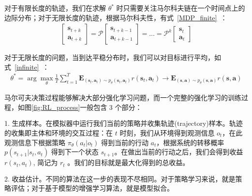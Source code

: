 对于有限长度的轨迹，我们在求解 $\theta^*$ 时只需要关注马尔科夫链在一个时间点上的边际分布；对于无限长度的轨迹，根据马尔科夫性，有式~\eqref{MDP_finite}~：
\begin{equation}
\label{MDP_finite}
\begin{aligned}
\left[\begin{array}{l}\mathbf{s}_{t+k}\\\mathbf{a}_{t+k}\end{array}\right]=\mathcal{P}\left[\begin{array}{l}\mathbf{s}_{t+k-1}\\\mathbf{a}_{t+k-1}\end{array}\right]=...=\mathcal{P}^k\left[\begin{array}{l}\mathbf{s}_{t}\\\mathbf{a}_{t}\end{array}\right]
\end{aligned}
\end{equation}

对于无限长度的问题，当到达平稳分布时，我们可以对目标进行平均，如式~\eqref{infinite}~：
\begin{equation}
\label{infinite}
\begin{aligned}
\theta^*=\arg\max_\theta\frac{1}{T}\sum_{t=1}^T\mathbf{E}_{(\mathbf{s}_t,\mathbf{a}_t)\sim p_\theta(\mathbf{s}_t,\mathbf{a}_t)}r(\mathbf{s}_t,\mathbf{a}_t)\rightarrow \mathbf{E}_{(\mathbf{s},\mathbf{a})\sim p_\theta(\mathbf{s},\mathbf{a})}r(\mathbf{s},\mathbf{a})
\end{aligned}
\end{equation}

马尔可夫决策过程能够解决大部分强化学习问题，而一个完整的强化学习的训练过程，如图\ref{fig:RL_process}一般包含 3 个部分：

1. 生成样本。在模拟器中运行我们当前的策略并收集轨迹(trajectory)样本。轨迹的收集即主体和环境的交互过程：在 $t$ 时刻，我们从环境得到观测信息 $o_t$，在此观测信息下根据策略 $\pi_\theta(a_t|o_t)$ 得到当前的行动 $a_t$，根据系统的转移概率 $p(s_{t+1}|s_t, a_t)$ 得到下一个状态 $s_{t+1}$。在做出当前的行动之后，我们会得到收益 $r(s_t,a_t)$, 简记为 $r_t$ 。我们的目标就是最大化得到的总收益。

2. 收益估计。不同的算法在这一步的表现不尽相同。对于策略学习来说，就是策略评估；对于基于模型的增强学习算法，就是模型拟合。

